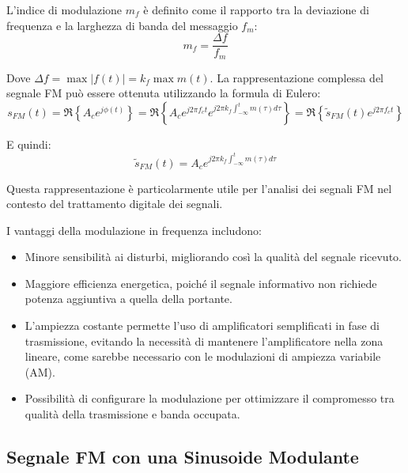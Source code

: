 L'indice di modulazione \( m_f \) è definito come il rapporto tra la deviazione di frequenza e la larghezza di banda del messaggio \( f_m \):
\begin{equation}
    m_f = \frac{\Delta f}{f_m}
\end{equation}

Dove $\Delta f = \max |f(t)| = k_f \max m(t)$.
La rappresentazione complessa del segnale FM può essere ottenuta utilizzando la formula di Eulero:
\begin{equation}
    s_{FM}(t) = \Re \left\{ A_c e^{j\phi(t)} \right\} = \Re \left\{ A_c e^{j2\pi f_c t} e^{j2\pi k_f \int_{-\infty}^{t} m(\tau) d\tau} \right\} = \Re \left\{ \tilde{s}_{FM} (t) e^{j2\pi f_c t} \right\}
\end{equation}

E quindi:
\begin{equation}
    \tilde{s}_{FM}(t) = A_c e^{j2\pi k_f \int_{-\infty}^{t} m(\tau) d\tau}
\end{equation}

Questa rappresentazione è particolarmente utile per l'analisi dei segnali FM nel contesto del trattamento digitale dei segnali.

I vantaggi della modulazione in frequenza includono:
\begin{itemize}
    \item Minore sensibilità ai disturbi, migliorando così la qualità del segnale ricevuto.
    \item Maggiore efficienza energetica, poiché il segnale informativo non richiede potenza aggiuntiva a quella della portante.
    \item L'ampiezza costante permette l'uso di amplificatori semplificati in fase di trasmissione, evitando la necessità di mantenere l'amplificatore nella zona lineare, come sarebbe necessario con le modulazioni di ampiezza variabile (AM).
    \item Possibilità di configurare la modulazione per ottimizzare il compromesso tra qualità della trasmissione e banda occupata.
\end{itemize}



\begin{center}
\end{center}

\subsection*{Segnale FM con una Sinusoide Modulante}

